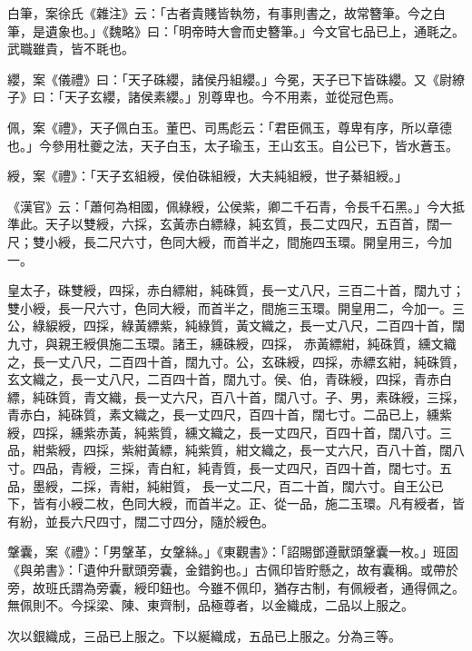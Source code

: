 \begin{pinyinscope}
 白筆，案徐氏《雜注》云：「古者貴賤皆執笏，有事則書之，故常簪筆。今之白筆，是遺象也。」《魏略》曰：「明帝時大會而史簪筆。」今文官七品已上，通毦之。武職雖貴，皆不毦也。



 纓，案《儀禮》曰：「天子硃纓，諸侯丹組纓。」今冕，天子已下皆硃纓。又《尉繚子》曰：「天子玄纓，諸侯素纓。」別尊卑也。今不用素，並從冠色焉。



 佩，案《禮》，天子佩白玉。董巴、司馬彪云：「君臣佩玉，尊卑有序，所以章德也。」今參用杜夔之法，天子白玉，太子瑜玉，王山玄玉。自公已下，皆水蒼玉。



 綬，案《禮》：「天子玄組綬，侯伯硃組綬，大夫純組綬，世子綦組綬。」



 《漢官》云：「蕭何為相國，佩綠綬，公侯紫，卿二千石青，令長千石黑。」今大抵準此。天子以雙綬，六採，玄黃赤白縹綠，純玄質，長二丈四尺，五百首，闊一尺；雙小綬，長二尺六寸，色同大綬，而首半之，間施四玉環。開皇用三，今加一。



 皇太子，硃雙綬，四採，赤白縹紺，純硃質，長一丈八尺，三百二十首，闊九寸；雙小綬，長一尺六寸，色同大綬，而首半之，間施三玉環。開皇用二，今加一。三公，綠綟綬，四採，綠黃縹紫，純綠質，黃文織之，長一丈八尺，二百四十首，闊九寸，與親王綬俱施二玉環。諸王，纁硃綬，四採，
 赤黃縹紺，純硃質，纁文織之，長一丈八尺，二百四十首，闊九寸。公，玄硃綬，四採，赤縹玄紺，純硃質，玄文織之，長一丈八尺，二百四十首，闊九寸。侯、伯，青硃綬，四採，青赤白縹，純硃質，青文織，長一丈六尺，百八十首，闊八寸。子、男，素硃綬，三採，青赤白，純硃質，素文織之，長一丈四尺，百四十首，闊七寸。二品已上，纁紫綬，四採，纁紫赤黃，純紫質，纁文織之，長一丈四尺，百四十首，闊八寸。三品，紺紫綬，四採，紫紺黃縹，純紫質，紺文織之，長一丈六尺，百八十首，闊八寸。四品，青綬，三採，青白紅，純青質，長一丈四尺，百四十首，闊七寸。五品，墨綬，二採，青紺，純紺質，
 長一丈二尺，百二十首，闊六寸。自王公已下，皆有小綬二枚，色同大綬，而首半之。正、從一品，施二玉環。凡有綬者，皆有紛，並長六尺四寸，闊二寸四分，隨於綬色。



 鞶囊，案《禮》：「男鞶革，女鞶絲。」《東觀書》：「詔賜鄧遵獸頭鞶囊一枚。」班固《與弟書》：「遺仲升獸頭旁囊，金錯鉤也。」古佩印皆貯懸之，故有囊稱。或帶於旁，故班氏謂為旁囊，綬印鈕也。今雖不佩印，猶存古制，有佩綬者，通得佩之。無佩則不。今採梁、陳、東齊制，品極尊者，以金織成，二品以上服之。



 次以銀織成，三品已上服之。下以綖織成，五品已上服之。分為三等。




\end{pinyinscope}
